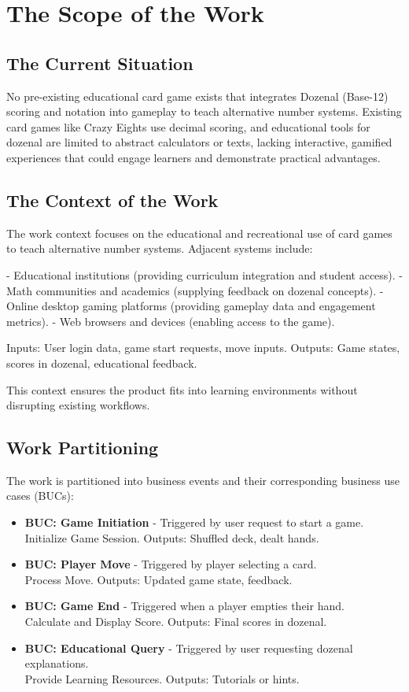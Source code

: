 \documentclass[12pt]{article}
\begin{document}
\section{The Scope of the Work}
\subsection{The Current Situation}

No pre-existing educational card game exists that integrates Dozenal (Base-12) scoring and notation into gameplay to teach alternative number systems. Existing card games like Crazy Eights use decimal scoring, and educational tools for dozenal are limited to abstract calculators or texts, lacking interactive, gamified experiences that could engage learners and demonstrate practical advantages.

\subsection{The Context of the Work}

The work context focuses on the educational and recreational use of card games to teach alternative number systems. Adjacent systems include:

- Educational institutions (providing curriculum integration and student access).
- Math communities and academics (supplying feedback on dozenal concepts).
- Online desktop gaming platforms (providing gameplay data and engagement metrics).
- Web browsers and devices (enabling access to the game).

Inputs: User login data, game start requests, move inputs. Outputs: Game states, scores in dozenal, educational feedback.

This context ensures the product fits into learning environments without disrupting existing workflows.

\subsection{Work Partitioning}

The work is partitioned into business events and their corresponding business use cases (BUCs):
\begin{itemize}
  \item \textbf{BUC:  Game Initiation} - Triggered by user request to start a game.\\ Initialize Game Session. Outputs: Shuffled deck, dealt hands.
  \item \textbf{BUC:  Player Move} - Triggered by player selecting a card.\\ Process Move. Outputs: Updated game state, feedback.
  \item \textbf{BUC:  Game End} - Triggered when a player empties their hand.\\ Calculate and Display Score. Outputs: Final scores in dozenal.
  \item \textbf{BUC:  Educational Query} - Triggered by user requesting dozenal explanations.\\Provide Learning Resources. Outputs: Tutorials or hints.
\end{itemize}
\end{document}
